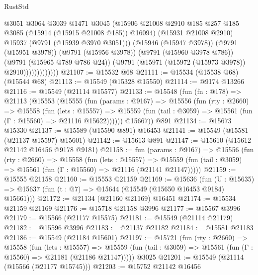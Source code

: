 \begin{lexlean}{RustStd}
\begin{coremodule}
                            @3051
                            @3064
                            @3039
                            @1471
                            @3045
                            (@15906
                              @21008
                              @2910
                              @185
                              @257
                              @185
                              @3085
                              (@15914 (@15915 @21008 @185))
                              @16094)
                            (@15931 @21008 @2910)
                            @15937
                            (@9791 (@15939 @3970 @3051)))
                          (@15946 (@15947 @3978))
                          (@9791 (@15951 @3978))
                          (@9791 (@15956 @3978))
                          (@9791 (@15960 @3978 @786))
                          (@9791 (@15965 @789 @786 @24))
                          (@9791 (@15971 (@15972 (@15973 @3978)) @2910)))))))))))))
@21107 := @15532 @68
@21111 := @15534 (@15538 @68) (@15544 @68)
@21113 := @15549 (@15328 @15550)
@21114 := @9174 @13266
@21116 := @15549 (@21114 @15577)
@21133 := @15548
    (fun (fn : @178) =>
    @21113
      (@15553
        (@15555
          (fun (params : @9167) =>
          @15556
            (fun (rty : @2660) =>
            @15558
              (fun (lets : @15557) =>
              @15559 (fun (tail : @3059) => @15561 (fun (Γ : @15560) => @21116 @15622))))))
        @15667))
    @891
@21134 := @15673 @15330
@21137 := @15589 (@15590 @891) @16453
@21141 := @15549 (@15581 (@21137 @15597) @15601)
@21142 := @15613 @891
@21147 := @15610 (@15612 @21142 @16456 @9178 @9181)
@21158 := fun (params : @9167) =>
  @15556
    (fun (rty : @2660) =>
    @15558
      (fun (lets : @15557) =>
      @15559 (fun (tail : @3059) => @15561 (fun (Γ : @15560) => @21116 (@21141 @21147)))))
@21159 := @15555 @21158
@21160 := @15553 @21159
@21169 := @15636
    (fun (U : @15635) => @15637 (fun (t : @7) => @15644 (@15549 (@15650 @16453 @9184) @15661)))
@21172 := @21134 (@21160 @21169) @16451
@21174 := @15534 @21159 @21169
@21176 := @15718 @21158 @3996
@21177 := @15567 @3996
@21179 := @15566 (@21177 @15575)
@21181 := @15549 (@21114 @21179)
@21182 := @15596 @3996
@21183 := @21137 @21182
@21184 := @15581 @21183
@21186 := @15549 (@21184 @15601)
@21197 := @15721
    (fun (rty : @2660) =>
    @15558
      (fun (lets : @15557) =>
      @15559 (fun (tail : @3059) => @15561 (fun (Γ : @15560) => @21181 (@21186 @21147)))))
    @3025
@21201 := @15549 (@21114 (@15566 (@21177 @15745)))
@21203 := @15752 @21142 @16456

\end{coremodule}
\end{lexlean}
